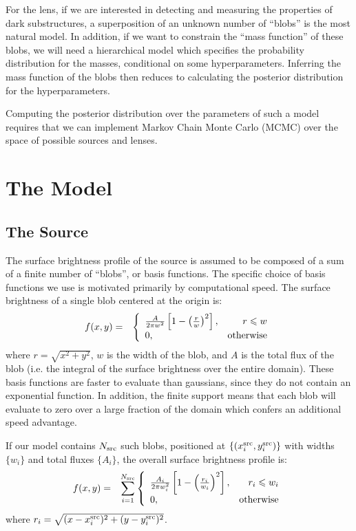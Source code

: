 \documentclass[useAMS,usenatbib]{mn2e}
\begin{document}
For the lens, if we are interested in detecting and measuring the properties of
dark substructures, a superposition of an unknown number of ``blobs'' is the
most natural model. In addition, if we want to constrain the ``mass function'' of
these blobs, we will need a hierarchical model which specifies the probability
distribution for the masses, conditional on some hyperparameters. Inferring the
mass function of the blobs then reduces to calculating the posterior
distribution for the hyperparameters.

Computing the posterior distribution over the parameters of such a model
requires that we can implement Markov Chain Monte Carlo (MCMC) over the space
of possible sources and lenses.

\section{The Model}

\subsection{The Source}
The surface brightness profile of the source is assumed to be composed of
a sum of a finite number of ``blobs'', or basis functions. The specific choice
of basis functions we use is motivated primarily by computational speed.
The surface brightness of a single blob centered at the origin
is:
\begin{eqnarray}
f(x, y) &=& \left\{
\begin{array}{lr}
\frac{A}{2\pi w^2}\left[1 - \left(\frac{r}{w}\right)^2\right], & r \leq w\\
0, & \textnormal{otherwise}
\end{array}
\right.
\end{eqnarray}
where $r = \sqrt{x^2 + y^2}$, $w$ is the width of the blob, and $A$ is the
total flux of the blob (i.e. the integral of the surface brightness over the
entire domain).
These basis functions are faster to evaluate than gaussians, since they do not
contain an exponential function. In addition, the finite support means that
each blob will evaluate to zero over a large fraction of the domain which
confers an additional speed advantage.

If our model contains $N_{\rm src}$ such blobs, positioned at
$\left\{(x_i^{\rm src}, y_i^{\rm src})\right\}$ with widths $\{w_i\}$ and total fluxes
$\{A_i\}$, the overall surface brightness profile is:
\begin{eqnarray}
f(x, y) &=& \sum_{i=1}^{N_{\rm src}}\left\{
\begin{array}{lr}
\frac{A_i}{2\pi w_i^2}\left[1 - \left(\frac{r_i}{w_i}\right)^2\right], & r_i \leq w_i\\
0, & \textnormal{otherwise}
\end{array}
\right.
\end{eqnarray}
where $r_i = \sqrt{(x - x_i^{\rm src})^2 + (y - y_i^{\rm src})^2}$.
\end{document}
